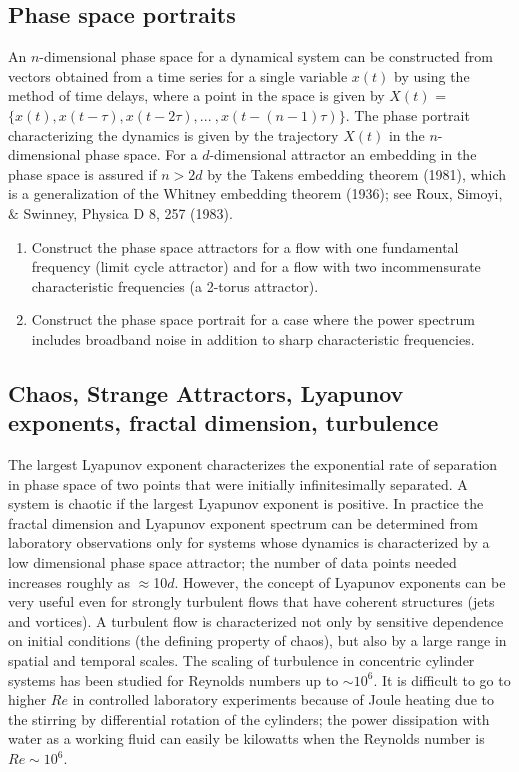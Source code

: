 \documentclass[%
 amsmath,amssymb,
 aps,
floatfix,
aps,prd,longbibliography,
notitlepage
]{revtex4-1}
\begin{document}
\subsection{Phase space portraits}

An $n$-dimensional phase space for a dynamical system can be constructed from vectors obtained from a time series for a single variable $x(t)$ by using the method of time delays, where a point in the space is given by $X(t)$ = $\{x(t), x(t-\tau), x(t-2\tau), . . .  \ , x(t-(n-1)\tau)\}$. The phase portrait characterizing the dynamics is given by the trajectory $X(t)$ in the $n$-dimensional phase space.  For a $d$-dimensional attractor an embedding in the phase space is assured if $n > 2d$ by the Takens embedding theorem (1981), which is a generalization of the Whitney embedding theorem (1936); see Roux, Simoyi, $\&$ Swinney, Physica D 8, 257 (1983).

\begin{enumerate}
\item Construct the phase space attractors for a flow with one fundamental frequency (limit cycle attractor) and for a flow with two incommensurate characteristic frequencies (a 2-torus attractor). 
\item Construct the phase space portrait for a case where the power spectrum includes broadband noise in addition to sharp characteristic frequencies.
\end{enumerate}

\subsection{Chaos, Strange Attractors, Lyapunov exponents, fractal dimension, turbulence}

The largest Lyapunov exponent characterizes the exponential rate of separation in phase space of two points that were initially infinitesimally separated.  A system is chaotic if the largest Lyapunov exponent is positive.  In practice the fractal dimension and Lyapunov exponent spectrum can be determined from laboratory observations only for systems whose dynamics is characterized by a low dimensional phase space attractor; the number of data points needed increases roughly as $\approx$10$d$.  However, the concept of Lyapunov exponents can be very useful even for strongly turbulent flows that have coherent structures (jets and vortices). A turbulent flow is characterized not only by sensitive dependence on initial conditions (the defining property of chaos), but also by a large range in spatial and temporal scales. The scaling of turbulence in concentric cylinder systems has been studied for Reynolds numbers up to $\sim10^6$.   It is difficult to go to higher $Re$ in controlled laboratory experiments because of Joule heating due to the stirring by differential rotation of the cylinders; the power dissipation with water as a working fluid can easily be kilowatts when the Reynolds number is $Re\sim10^6$.
\end{document}
